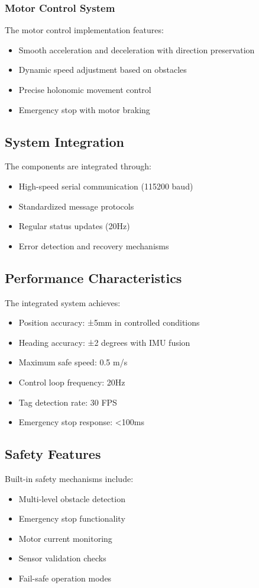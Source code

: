 \documentclass{article}
\begin{document}
\subsubsection{Motor Control System}
The motor control implementation features:
\begin{itemize}
    \item Smooth acceleration and deceleration with direction preservation
    \item Dynamic speed adjustment based on obstacles
    \item Precise holonomic movement control
    \item Emergency stop with motor braking
\end{itemize}

\subsection{System Integration}
The components are integrated through:
\begin{itemize}
    \item High-speed serial communication (115200 baud)
    \item Standardized message protocols
    \item Regular status updates (20Hz)
    \item Error detection and recovery mechanisms
\end{itemize}

\subsection{Performance Characteristics}
The integrated system achieves:
\begin{itemize}
    \item Position accuracy: ±5mm in controlled conditions
    \item Heading accuracy: ±2 degrees with IMU fusion
    \item Maximum safe speed: 0.5 m/s
    \item Control loop frequency: 20Hz
    \item Tag detection rate: 30 FPS
    \item Emergency stop response: <100ms
\end{itemize}

\subsection{Safety Features}
Built-in safety mechanisms include:
\begin{itemize}
    \item Multi-level obstacle detection
    \item Emergency stop functionality
    \item Motor current monitoring
    \item Sensor validation checks
    \item Fail-safe operation modes
\end{itemize}
\end{document}
